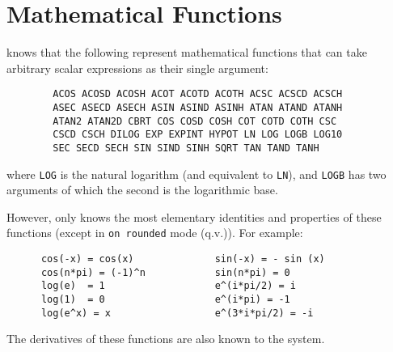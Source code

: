 \section{Mathematical Functions}

{\REDUCE} knows that the following represent mathematical functions
 that can
take arbitrary scalar expressions as their single argument:
\begin{verbatim}
        ACOS ACOSD ACOSH ACOT ACOTD ACOTH ACSC ACSCD ACSCH
        ASEC ASECD ASECH ASIN ASIND ASINH ATAN ATAND ATANH
        ATAN2 ATAN2D CBRT COS COSD COSH COT COTD COTH CSC
        CSCD CSCH DILOG EXP EXPINT HYPOT LN LOG LOGB LOG10
        SEC SECD SECH SIN SIND SINH SQRT TAN TAND TANH
\end{verbatim}
    
    
   
   
    
    
    
    
    
    
where {\tt LOG} is the natural logarithm (and equivalent to {\tt LN}),
and {\tt LOGB} has two arguments of which the second is the logarithmic base.

However, {\REDUCE} only knows the most elementary identities and properties
of these functions (except in {\tt on rounded} mode (q.v.)).  For example:
\begin{verbatim}
      cos(-x) = cos(x)              sin(-x) = - sin (x)
      cos(n*pi) = (-1)^n            sin(n*pi) = 0
      log(e)  = 1                   e^(i*pi/2) = i
      log(1)  = 0                   e^(i*pi) = -1
      log(e^x) = x                  e^(3*i*pi/2) = -i
\end{verbatim}

The derivatives of these functions are also known to the system.

